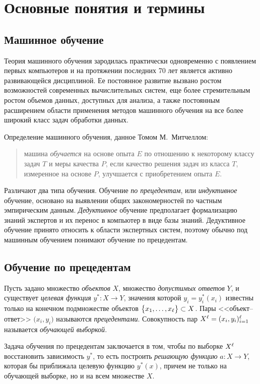 \onehalfspacing
\chapter{Основные понятия и термины}
\section{Машинное обучение}
Теория машинного обучения зародилась практически одновременно с появлением первых компьютеров и на
протяжении последних 70 лет является активно развивающейся дисциплиной. Ее постоянное развитие вызвано
ростом возможностей современных вычислительных систем, еще более стремительным ростом объемов данных,
доступных для анализа, а также постоянным расширением области применения методов машинного обучения на
все более широкий класс задач обработки данных.

Определение машинного обучения, данное Томом М.~Митчеллом:
\begin{quotation}
\vspace*{-1ex}
машина \emph{обучается} на основе опыта \( E \) по отношению к некоторому классу задач \( T \) и меры
качества \( P \), если качество решения задач из класса \( T \), измеренное на основе \( P \),
улучшается с приобретением опыта \( E \).
\end{quotation}

Различают два типа обучения. Обучение \emph{по прецедентам}, или \emph{индуктивное} обучение, основано
на выявлении общих закономерностей по частным эмпирическим данным. \emph{Дедуктивное} обучение
предполагает формализацию знаний экспертов и их перенос в компьютер в виде базы знаний. Дедуктивное
обучение принято относить к области экспертных систем, поэтому обычно под машинным обучением понимают
обучение по прецедентам.

\section{Обучение по прецедентам}
Пусть задано множество \emph{объектов} \( X \), множество \emph{допустимых ответов} \( Y \), и
существует \emph{целевая функция} \( y^*\colon X \to Y \), значения которой \( y_i = y^*_i (x_i) \)
известны только на конечном подмножестве объектов \( \bigl\{ x_1, \dots, x_\ell \bigr\} \subset X \).
Пары <<объект--ответ>> \( \bigl( x_i, y_i \bigr) \) называются \emph{прецедентами}. Совокупность пар
\( X^\ell = (x_i, y_i)_{i = 1}^\ell \) называется \emph{обучающей выборкой}.

Задача обучения по прецедентам заключается в том, чтобы по выборке \( X^\ell \) восстановить зависимость
\( y^* \), то есть построить \emph{решающую функцию} \( a\colon X \to Y \), которая бы приближала
целевую функцию \( y^*(x) \), причем не только на обучающей выборке, но и на всем множестве \( X \).

